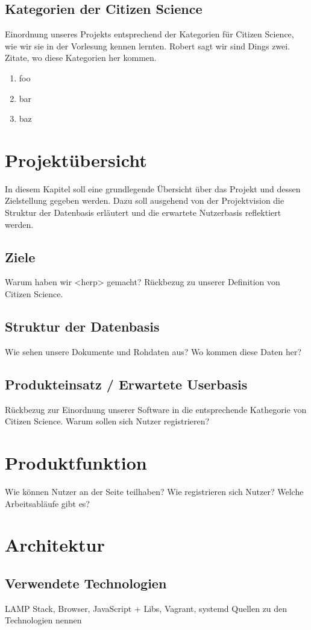\documentclass{article}
\begin{document}
\subsection{Kategorien der Citizen Science}
Einordnung unseres Projekts entsprechend der Kategorien für Citizen Science,
wie wir sie in der Vorlesung kennen lernten.
Robert sagt wir sind Dings zwei.
Zitate, wo diese Kategorien her kommen.
\begin{enumerate}
\item foo
\item bar
\item baz
\end{enumerate}
\section{Projektübersicht}
In diesem Kapitel soll eine grundlegende Übersicht über das Projekt und dessen Zielstellung gegeben werden. Dazu soll ausgehend von der Projektvision die Struktur der Datenbasis erläutert und die erwartete Nutzerbasis reflektiert werden.
\subsection{Ziele}
Warum haben wir <herp> gemacht?
Rückbezug zu unserer Definition von Citizen Science.
\subsection{Struktur der Datenbasis}
Wie sehen unsere Dokumente und Rohdaten aus?
Wo kommen diese Daten her?
\subsection{Produkteinsatz / Erwartete Userbasis}
Rückbezug zur Einordnung unserer Software in die entsprechende Kathegorie von Citizen Science.
Warum sollen sich Nutzer registrieren?
\section{Produktfunktion}
Wie können Nutzer an der Seite teilhaben?
Wie registrieren sich Nutzer?
Welche Arbeitsabläufe gibt es?
\section{Architektur}
\subsection{Verwendete Technologien}
LAMP Stack, Browser, JavaScript + Libs, Vagrant, systemd 
Quellen zu den Technologien nennen
\end{document}
